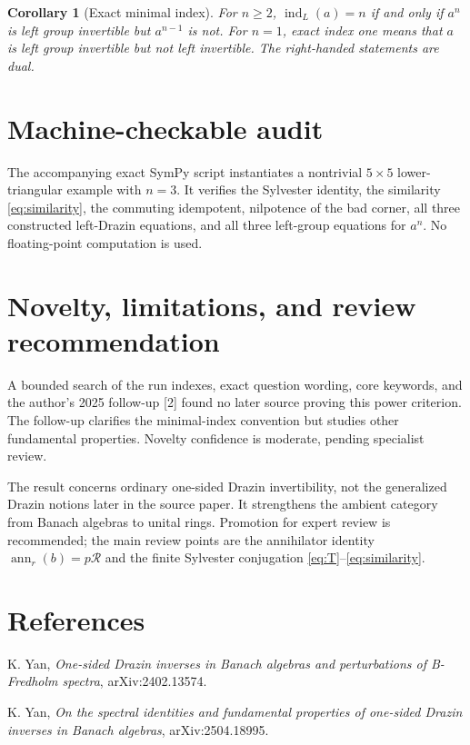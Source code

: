 \documentclass[11pt]{article}
\newtheorem{corollary}{Corollary}
\newcommand{\R}{\mathcal R}
\newcommand{\indL}{\operatorname{ind}_{L}}
\begin{document}
\begin{corollary}[Exact minimal index]
For \(n\geq2\), \(\indL(a)=n\) if and only if \(a^n\) is left group
invertible but \(a^{n-1}\) is not.  For \(n=1\), exact index one means that
\(a\) is left group invertible but not left invertible.  The right-handed
statements are dual.
\end{corollary}

\section*{Machine-checkable audit}

The accompanying exact SymPy script instantiates a nontrivial \(5\times5\)
lower-triangular example with \(n=3\).  It verifies the Sylvester identity,
the similarity \eqref{eq:similarity}, the commuting idempotent, nilpotence of
the bad corner, all three constructed left-Drazin equations, and all three
left-group equations for \(a^n\).  No floating-point computation is used.

\section*{Novelty, limitations, and review recommendation}

A bounded search of the run indexes, exact question wording, core keywords,
and the author's 2025 follow-up [2] found no later source proving
this power criterion.  The follow-up clarifies the minimal-index convention
but studies other fundamental properties.  Novelty confidence is moderate,
pending specialist review.

The result concerns ordinary one-sided Drazin invertibility, not the
generalized Drazin notions later in the source paper.  It strengthens the
ambient category from Banach algebras to unital rings.  Promotion for expert
review is recommended; the main review points are the annihilator identity
\(\operatorname{ann}_r(b)=p\R\) and the finite Sylvester conjugation
\eqref{eq:T}--\eqref{eq:similarity}.

\enlargethispage{2\baselineskip}
\section*{References}
{\small\raggedright
\noindent[1] K. Yan, \emph{One-sided Drazin inverses in Banach algebras and
perturbations of B-Fredholm spectra}, arXiv:2402.13574.\par
\noindent[2] K. Yan, \emph{On the spectral identities and fundamental
properties of one-sided Drazin inverses in Banach algebras},
arXiv:2504.18995.\par}
\end{document}
